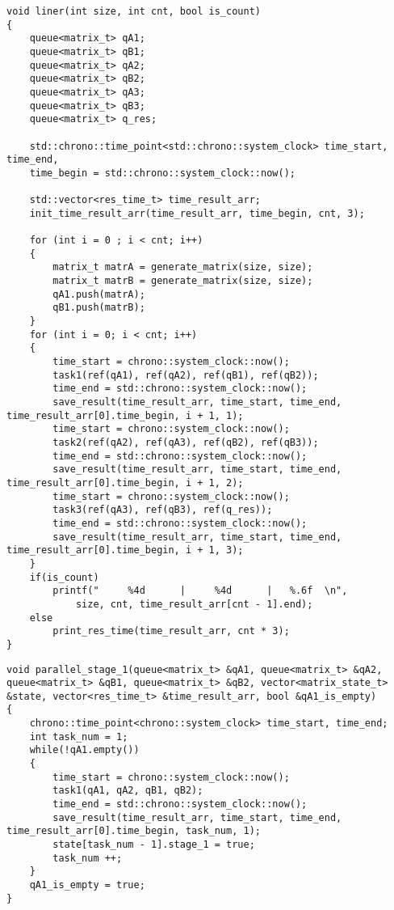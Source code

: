 \begin{lstlisting}[label=lst:linear_processing,caption=Функция алгоритма линейной обработки матрицы]
void liner(int size, int cnt, bool is_count)
{
    queue<matrix_t> qA1;
    queue<matrix_t> qB1;
    queue<matrix_t> qA2;
    queue<matrix_t> qB2;
    queue<matrix_t> qA3;
    queue<matrix_t> qB3;
    queue<matrix_t> q_res;

    std::chrono::time_point<std::chrono::system_clock> time_start, time_end,
    time_begin = std::chrono::system_clock::now();

    std::vector<res_time_t> time_result_arr;
    init_time_result_arr(time_result_arr, time_begin, cnt, 3);

    for (int i = 0 ; i < cnt; i++)
    {
        matrix_t matrA = generate_matrix(size, size);
        matrix_t matrB = generate_matrix(size, size);
        qA1.push(matrA);
        qB1.push(matrB);
    }
    for (int i = 0; i < cnt; i++)
    {
        time_start = chrono::system_clock::now();
        task1(ref(qA1), ref(qA2), ref(qB1), ref(qB2));
        time_end = std::chrono::system_clock::now();
        save_result(time_result_arr, time_start, time_end, time_result_arr[0].time_begin, i + 1, 1);
        time_start = chrono::system_clock::now();
        task2(ref(qA2), ref(qA3), ref(qB2), ref(qB3));
        time_end = std::chrono::system_clock::now();
        save_result(time_result_arr, time_start, time_end, time_result_arr[0].time_begin, i + 1, 2);
        time_start = chrono::system_clock::now();
        task3(ref(qA3), ref(qB3), ref(q_res));
        time_end = std::chrono::system_clock::now();
        save_result(time_result_arr, time_start, time_end, time_result_arr[0].time_begin, i + 1, 3);
    }
    if(is_count)
        printf("     %4d      |     %4d      |   %.6f  \n",
            size, cnt, time_result_arr[cnt - 1].end);
    else
        print_res_time(time_result_arr, cnt * 3);
}
\end{lstlisting}

\begin{lstlisting}[label=lst:parallel_stage_1,caption=Функция 1-ой ленты конвейерной обработки матрицы]
void parallel_stage_1(queue<matrix_t> &qA1, queue<matrix_t> &qA2, queue<matrix_t> &qB1, queue<matrix_t> &qB2, vector<matrix_state_t> &state, vector<res_time_t> &time_result_arr, bool &qA1_is_empty)
{
    chrono::time_point<chrono::system_clock> time_start, time_end;
    int task_num = 1;
    while(!qA1.empty())
    {
        time_start = chrono::system_clock::now();
        task1(qA1, qA2, qB1, qB2);
        time_end = std::chrono::system_clock::now();
        save_result(time_result_arr, time_start, time_end, time_result_arr[0].time_begin, task_num, 1);
        state[task_num - 1].stage_1 = true;
        task_num ++;
    }
    qA1_is_empty = true;
}
\end{lstlisting}

